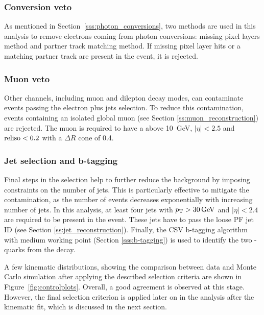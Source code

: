 
\subsubsection*{Conversion veto}
As mentioned in Section~\ref{sss:photon_conversions}, two methods are used in this analysis to remove electrons coming
from photon conversions: missing pixel layers method and partner track matching method. If missing pixel layer hits or a
matching partner track are present in the event, it is rejected.

\subsubsection*{Muon veto}
Other \ttbar channels, including muon and dilepton decay modes, can contaminate events passing the electron plus jets
selection. To reduce this contamination, events containing an isolated global muon (see Section
\ref{ss:muon_reconstruction}) are rejected. The muon is required to have a \pt above \SI{10}{\GeV}, $|\eta| < 2.5$ and
$\textrm{reliso} < 0.2$ with a $\Delta R$ cone of \num{0.4}.

\subsubsection*{Jet selection and b-tagging}
Final steps in the selection help to further reduce the background by imposing constraints on the number of jets. This
is particularly effective to mitigate the \WpJets contamination, as the number of \WpJets events decreases exponentially
with increasing number of jets. In this analysis, at least four jets with $\pt > \SI{30}{\GeV}$ and $|\eta| < 2.4$ are
required to be present in the event. These jets have to pass the loose PF jet ID (see Section
\ref{ss:jet_reconstruction}). Finally, the CSV b-tagging algorithm with medium working point (Section
\ref{sss:b-tagging}) is used to identify the two \cPqb-quarks from the \ttbar decay.

A few kinematic distributions, showing the comparison between data and Monte Carlo simulation after applying the
described selection criteria are shown in Figure~\ref{fig:controlplots}. Overall, a good agreement is observed at this
stage. However, the final selection criterion is applied later on in the analysis after the kinematic fit, which is
discussed in the next section.

